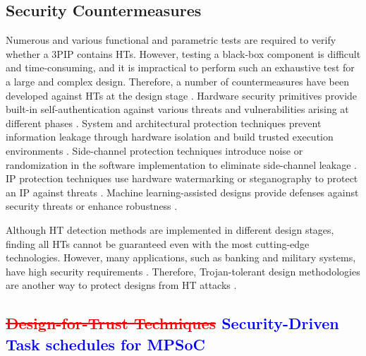 \documentclass[10pt,journal, compsoc]{IEEEtran}
\begin{document}
\subsection{Security Countermeasures}







Numerous and various functional and parametric tests are required to verify whether a 3PIP contains HTs. However, testing a black-box component is difficult and time-consuming, and it is impractical to perform such an exhaustive test for a large and complex design. Therefore, a number of countermeasures have been developed against HTs at the design stage \cite{article:WH}. Hardware security primitives provide built-in self-authentication against various threats and vulnerabilities arising at different phases \cite{article:DM}. System and architectural protection techniques prevent information leakage through hardware isolation and build trusted execution environments \cite{article:NH}. Side-channel protection techniques introduce noise or randomization in the software implementation to eliminate side-channel leakage \cite{conference:HK}. IP protection techniques use hardware watermarking or steganography to protect an IP against threats \cite{article:AS1}. Machine learning-assisted designs provide defenses against security threats or enhance robustness \cite{article:SY1}.

Although HT detection methods are implemented in different design stages, finding all HTs cannot be guaranteed even with the most cutting-edge technologies. However, many applications, such as banking and military systems, have high security requirements \cite{conference:XZ}. Therefore, Trojan-tolerant design methodologies are another way to protect designs from HT attacks \cite{article:KX}.


\subsection{\textcolor{red}{\sout{Design-for-Trust Techniques}} \textcolor{blue}{Security-Driven Task schedules for MPSoC}}
\end{document}
